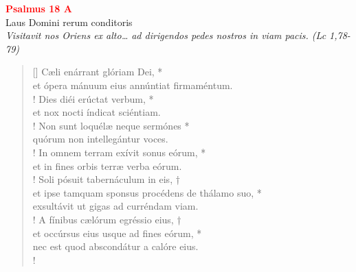 


\def\greinitialformat#1{%
{\fontsize{39}{39}\selectfont #1}%
}




\vspace{0.3cm}
\begin{center}
 \textcolor{red}{\large \bf Psalmus 18 A}\\
Laus Domini rerum conditoris\\
\textit{\small Visitavit nos Oriens ex alto… ad dirigendos pedes nostros in viam pacis. (Lc 1,78-79)}
\end{center}
\begin{verse}[\versewidth]
Cæli enárrant glóriam Dei, *\\
et ópera mánuum eius annúntiat firmaméntum.\\!
\vin Dies diéi erúctat verbum, *\\
\vin et nox nocti índicat sciéntiam.\\!
Non sunt loquélæ neque sermónes *\\
quórum non intellegántur voces.\\!
\vin In omnem terram exívit sonus eórum, *\\
\vin et in fines orbis terræ verba eórum.\\!
Soli pósuit tabernáculum in eis, †\\
et ipse tamquam sponsus procédens de thálamo suo, *\\
exsultávit ut gigas ad curréndam viam.\\!
\vin A fínibus cælórum egréssio eius, †\\
\vin et occúrsus eius usque ad fines eórum, *\\
\vin nec est quod abscondátur a calóre eius.\\!
\end{verse}
\vspace{1cm}



